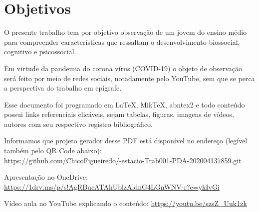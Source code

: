 \chapter{Objetivos}

O presente trabalho tem por objetivo observação de um jovem do ensino médio para compreender características  que ressaltam o  desenvolvimento biossocial, cognitivo e psicossocial.

Em virtude da pandemia do corona vírus (COVID-19) o objeto de observação será feito por meio de redes sociais, notadamente pelo YouTube, sem que se perca a perspectiva do trabalho em epígrafe.

Esse documento foi programado em \LaTeX, MikTeX, abntex2 e todo conteúdo possui links referenciais clicáveis, sejam tabelas, figuras, imagens de vídeos, autores com seu respectivo registro bibliográfico.

Informamos que projeto gerador desse PDF está disponível no endereço (legível também pelo QR Code abaixo): \\
\url{https://github.com/ChicoFigueiredo/-estacio-Trab001-PDA-202004137859.git} \\
\begin{center}
    \href{https://github.com/ChicoFigueiredo/-estacio-Trab001-PDA-202004137859.git}{
    }
\end{center}


Apresentação no OneDrive: \url{https://1drv.ms/p/s!AgRBucATAhUblzAldnG4LGnWNV-r?e=ykIvGi} \\
\begin{center}
    \href{https://1drv.ms/p/s!AgRBucATAhUblzAldnG4LGnWNV-r?e=ykIvGi}{
    }
\end{center}


Vídeo aula no YouTube explicando o conteúdo: \url{https://youtu.be/szsZ_Uuk1zk} \\
\begin{center}
    \href{https://youtu.be/szsZ_Uuk1zk}{
    }
\end{center}

